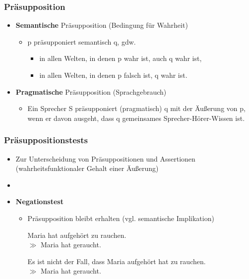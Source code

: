 
\begin{frame}
\frametitle{Präsupposition}

\begin{itemize}
	\item \textbf{Semantische} Präsupposition  (Bedingung für Wahrheit)
	
	\begin{itemize}
		\item p präsupponiert semantisch q, gdw.

		\begin{itemize}
			\item in allen Welten, in denen p wahr ist, auch q wahr ist,
			\item in allen Welten, in denen p falsch ist, q wahr ist.
		\end{itemize}

	\end{itemize}
	
\vspace{1ex}

	\item \textbf{Pragmatische} Präsupposition (Sprachgebrauch)
	
	\begin{itemize}
		\item Ein Sprecher S präsupponiert (pragmatisch) q mit der Äu\ss{}erung von p, wenn er davon ausgeht, dass q gemeinsames Sprecher-Hörer-Wissen ist.
	\end{itemize}
	
\end{itemize}

\end{frame}



\begin{frame}
\frametitle{Präsuppositionstests}

\begin{itemize}
	\item Zur Unterscheidung von Präsuppositionen und Assertionen (wahrheitsfunktionaler Gehalt einer Äu\ss{}erung)
	\item[]
	\item \textbf{Negationstest}
	
	\begin{itemize}
		\item Präsupposition bleibt erhalten (vgl. semantische Implikation)		
		
		\ea Maria hat aufgehört zu rauchen.\\ $\gg$ Maria hat geraucht.
		\z
		
		\ea Es ist nicht der Fall, dass Maria aufgehört hat zu rauchen.\\ $\gg$ Maria hat geraucht.
		\z
		
	\end{itemize}	

\end{itemize}	



\end{frame}


